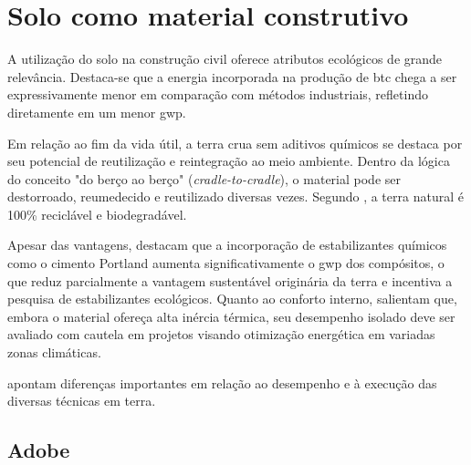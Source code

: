 \section{Solo como material construtivo}


A utilização do solo na construção civil oferece atributos ecológicos de grande relevância. Destaca-se que a energia incorporada na produção de \gls{btc} chega a ser expressivamente menor em comparação com métodos industriais, refletindo diretamente em um menor \gls{gwp}. 

Em relação ao fim da vida útil, a terra crua sem aditivos químicos se destaca por seu potencial de reutilização e reintegração ao meio ambiente. Dentro da lógica do conceito "do berço ao berço" (\textit{cradle-to-cradle}), o material pode ser destorroado, reumedecido e reutilizado diversas vezes. Segundo , a terra natural é 100\% reciclável e biodegradável. 

Apesar das vantagens,  destacam que a incorporação de estabilizantes químicos como o cimento Portland aumenta significativamente o \gls{gwp} dos compósitos, o que reduz parcialmente a vantagem sustentável originária da terra e incentiva a pesquisa de estabilizantes ecológicos. Quanto ao conforto interno,  salientam que, embora o material ofereça alta inércia térmica, seu desempenho isolado deve ser avaliado com cautela em projetos visando otimização energética em variadas zonas climáticas. 

 apontam diferenças importantes em relação ao desempenho e à execução das diversas técnicas em terra.

\subsection{Adobe}


